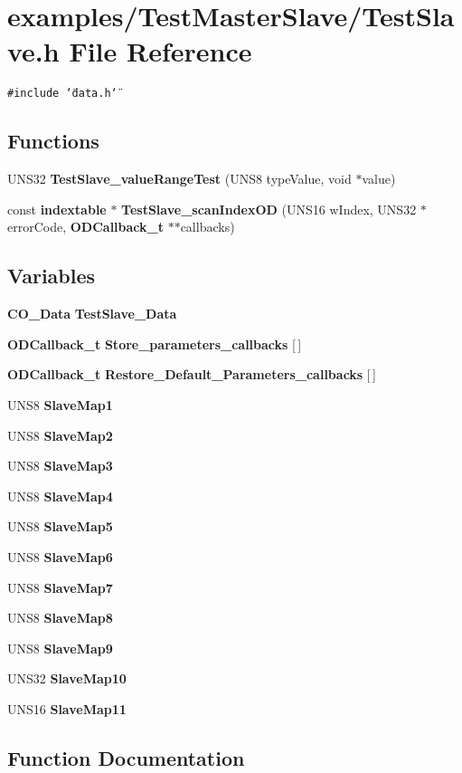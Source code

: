 \section{examples/Test\-Master\-Slave/Test\-Slave.h File Reference}
\label{TestSlave_8h}
{\tt \#include \char`\"{}data.h\char`\"{}}\par
\subsection*{Functions}
\begin{CompactItemize}
\item 
UNS32 {\bf Test\-Slave\_\-value\-Range\-Test} (UNS8 type\-Value, void $\ast$value)
\item 
const {\bf indextable} $\ast$ {\bf Test\-Slave\_\-scan\-Index\-OD} (UNS16 w\-Index, UNS32 $\ast$error\-Code, {\bf ODCallback\_\-t} $\ast$$\ast$callbacks)
\end{CompactItemize}
\subsection*{Variables}
\begin{CompactItemize}
\item 
{\bf CO\_\-Data} {\bf Test\-Slave\_\-Data}
\item 
{\bf ODCallback\_\-t} {\bf Store\_\-parameters\_\-callbacks} [$\,$]
\item 
{\bf ODCallback\_\-t} {\bf Restore\_\-Default\_\-Parameters\_\-callbacks} [$\,$]
\item 
UNS8 {\bf Slave\-Map1}
\item 
UNS8 {\bf Slave\-Map2}
\item 
UNS8 {\bf Slave\-Map3}
\item 
UNS8 {\bf Slave\-Map4}
\item 
UNS8 {\bf Slave\-Map5}
\item 
UNS8 {\bf Slave\-Map6}
\item 
UNS8 {\bf Slave\-Map7}
\item 
UNS8 {\bf Slave\-Map8}
\item 
UNS8 {\bf Slave\-Map9}
\item 
UNS32 {\bf Slave\-Map10}
\item 
UNS16 {\bf Slave\-Map11}
\end{CompactItemize}


\subsection{Function Documentation}
